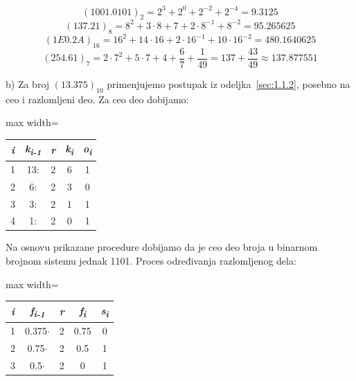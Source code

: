 \documentclass[a4paper,11pt]{article}
\numberwithin{equation}{section}
\newcommand{\redlinija}{\arrayrulecolor{black!28}\specialrule{0.3pt}{2pt}{2pt}\arrayrulecolor{black}}
\begin{document}
\begin{equation}\label{eq:2.1.1}
(1001.0101)_2=2^3+2^0+2^{-2}+2^{-4}=9.3125
\end{equation}
\begin{equation}\label{eq:2.1.2}
(137.21)_8=8^2+3\cdot8+7+2\cdot8^{-1}+8^{-2}=95.265625
\end{equation}
\begin{equation}\label{eq:2.1.3}
(1E0.2A)_{16}=16^2+14\cdot16+2\cdot16^{-1}+10\cdot16^{-2}=480.1640625
\end{equation}
\begin{equation}\label{eq:2.1.4}
(254.61)_7=2\cdot7^2+5\cdot7+4+\frac67+\frac1{49}=137+\frac{43}{49}\approx137.877551
\end{equation}


b) Za broj $(13.375)_{10}$ primenjujemo postupak iz odeljka~\ref{sec:1.1.2}, posebno na ceo i razlomljeni deo. Za ceo deo dobijamo:

\begin{center}\begin{adjustbox}{max width=\linewidth}
\begin{tabular}{ccccc}\toprule
\emph{i} & \emph{k\textsubscript{i-1}} & \emph{r} & \emph{k\textsubscript{i}} & \emph{o\textsubscript{i}} \\
\midrule
1 & 13: & 2 & 6 & 1 \\
\redlinija
2 & 6: & 2 & 3 & 0 \\
\redlinija
3 & 3: & 2 & 1 & 1 \\
\redlinija
4 & 1: & 2 & 0 & 1 \\
\bottomrule\end{tabular}\end{adjustbox}\end{center}


Na osnovu prikazane procedure dobijamo da je ceo deo broja u binarnom brojnom sistemu jednak 1101. Proces određivanja razlomljenog dela:



\begin{center}\begin{adjustbox}{max width=\linewidth}
\begin{tabular}{ccccc}\toprule
\emph{i} & \emph{f\textsubscript{i-1}} & \emph{r} & \emph{f\textsubscript{i}} & \emph{s\textsubscript{i}} \\
\midrule
1 & 0.375$\cdot$ & 2 & 0.75 & 0 \\
\redlinija
2 & 0.75\ensuremath{\cdot} & 2 & 0.5 & 1 \\
\redlinija
3 & 0.5\ensuremath{\cdot} & 2 & 0 & 1 \\
\bottomrule\end{tabular}\end{adjustbox}\end{center}
\end{document}
